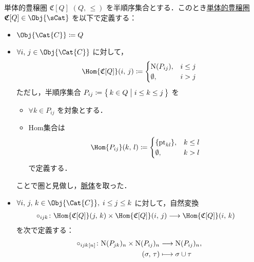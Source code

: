 \documentclass[TQFT_main]{subfiles}
\begin{document}
\begin{mydef}[label=def:PathCat]{単体的豊穣圏 {$\mathfrak{C}[Q]$}}
$(Q,\, \le)$ を半順序集合とする．このとき\hyperref[def:SimpCat]{単体的豊穣圏} $\bm{\mathfrak{C}}[Q] \in \Obj{\sCat}$ を以下で定義する：
\begin{itemize}
    \item $\Obj{\Cat{C}} \coloneqq Q$
    \item $\forall i,\, j \in \Obj{\Cat{C}}$ に対して，
    \begin{align}
        \Hom{\mathfrak{C}[Q]} (i,\, j) \coloneqq 
        \begin{cases}
            \mathrm{N}(P_{ij}), &i \le j \\
            \emptyset, &i > j
        \end{cases}
    \end{align}
    ただし，半順序集合 $P_{ij} \coloneqq \bigl\{\, k \in Q \bigm| i \le k \le j \,\bigr\}$ を
    \begin{itemize}
        \item $\forall k \in P_{ij}$ を対象とする．
        \item Hom集合は
        \begin{align}
            \Hom{P_{ij}} (k,\, l) \coloneqq 
            \begin{cases}
                \{\mathrm{pt}_{kl}\}, &k \le l \\
                \emptyset, &k > l
            \end{cases}
        \end{align}
        で定義する．
    \end{itemize}
    ことで圏と見做し，\hyperref[def:nerve]{脈体}を取った．
    \item $\forall i,\, j,\, k \in \Obj{\Cat{C}},\; i \le j \le k$ に対して，自然変換
    \begin{align}
        \circ_{ijk} \colon \Hom{\mathfrak{C}[Q]}(j,\, k) \times \Hom{\mathfrak{C}[Q]}(i,\, j) &\lto \Hom{\mathfrak{C}[Q]}(i,\, k)
    \end{align}
    を次で定義する：
    \begin{align}
        \circ_{ijk}{}_{[n]} \colon \mathrm{N}(P_{jk})_n \times \mathrm{N}(P_{ij})_n &\longrightarrow \mathrm{N}(P_{ij})_n, \\
        (\sigma,\, \tau) &\longmapsto \sigma \cup \tau
    \end{align}
\end{itemize}    
\end{mydef}
\end{document}
